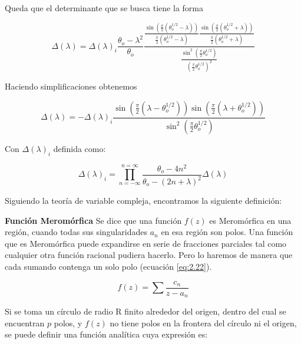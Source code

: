 Queda que el determinante que se busca tiene la forma 

 \begin{equation}\label{eq:E.23}
 \Delta(\lambda)= \Delta(\lambda)_{i}\frac{ \theta_o-\lambda^2}{\theta_o}\frac{\frac{\sin(\frac{\pi}{2}(\theta_o^{1/2}-\lambda))}{\frac{\pi}{2}( \theta_o^{1/2}-\lambda)}\frac{\sin(\frac{\pi}{2}( \theta_o^{1/2}+\lambda))}{\frac{\pi}{2}( \theta_o^{1/2}+\lambda)}}{\frac{\sin^2(\frac{\pi}{2}\theta_o^{1/2})}{(\frac{\pi}{2}\theta_o^{1/2})^2}}
 \end{equation}

 
Haciendo simplificaciones obtenemos 
 

 \begin{equation}\label{eq:2.20}
 \Delta(\lambda)= -\Delta(\lambda)_{i}\frac{\sin(\frac{\pi}{2}(\lambda-\theta_o^{1/2}))\sin(\frac{\pi}{2}( \lambda+\theta_o^{1/2}))}{\sin^2(\frac{\pi}{2}\theta_o^{1/2})}
\end{equation}
\normalsize

Con $\Delta(\lambda)_i$ definida como: 

\begin{equation}\label{eq:2.21}
\Delta(\lambda)_{i} = \prod_{n=-\infty}^{n=\infty} \frac{\theta_o-4n^2}{\theta_o-(2n+\lambda)^2} \Delta(\lambda)
\end{equation}

Siguiendo la teoría de variable compleja, encontramos la siguiente definición:

\begin{defi}{\textbf{Función Meromórfica}}\label{def:1}
Se dice que una función $f(z)$ es Meromórfica en una región, cuando todas sus singularidades $a_n$ en esa región son polos.
Una función que es Meromórfica puede expandirse en serie de fracciones parciales tal como cualquier otra función racional pudiera hacerlo. Pero lo haremos de manera que cada sumando contenga un solo polo\cite{Philip} (ecuación \ref{eq:2.22}).

\begin{equation}\label{eq:2.22}
    f(z)=\sum \frac{c_n}{z-a_n}
\end{equation}
\end{defi}

Si se toma un círculo de radio R finito alrededor del origen, dentro del cual se encuentran $p$ polos, y $f(z)$ no tiene polos en la frontera del círculo ni el origen, se puede definir una función analítica cuya expresión es:

